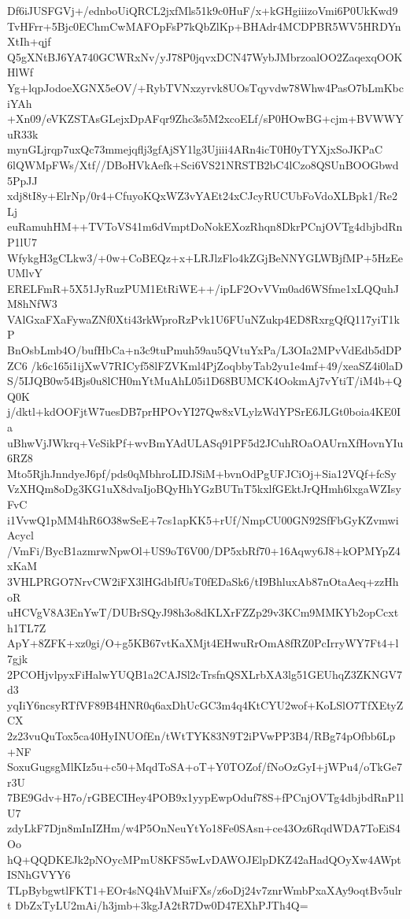 Df6iJUSFGVj+/ednboUiQRCL2jxfMls51k9c0HuF/x+kGHgiiizoVmi6P0UkKwd9
TvHFrr+5Bjc0EChmCwMAFOpFsP7kQbZlKp+BHAdr4MCDPBR5WV5HRDYnXtIh+qjf
Q5gXNtBJ6YA740GCWRxNv/yJ78P0jqvxDCN47WybJMbrzoalOO2ZaqexqOOKHlWf
Yg+lqpJodoeXGNX5eOV/+RybTVNxzyrvk8UOsTqyvdw78Whw4PasO7bLmKbciYAh
+Xn09/eVKZSTAsGLejxDpAFqr9Zhc3s5M2xcoELf/sP0HOwBG+cjm+BVWWYuR33k
mynGLjrqp7uxQc73mmejqflj3gfAjSY1lg3Ujiii4ARn4icT0H0yTYXjxSoJKPaC
6lQWMpFWs/Xtf//DBoHVkAefk+Sci6VS21NRSTB2bC4lCzo8QSUnBOOGbwd5PpJJ
xdj8tI8y+ElrNp/0r4+CfuyoKQxWZ3vYAEt24xCJcyRUCUbFoVdoXLBpk1/Re2Lj
euRamuhHM++TVToVS41m6dVmptDoNokEXozRhqn8DkrPCnjOVTg4dbjbdRnP1lU7
WfykgH3gCLkw3/+0w+CoBEQz+x+LRJlzFlo4kZGjBeNNYGLWBjfMP+5HzEeUMlvY
ERELFmR+5X51JyRuzPUM1EtRiWE++/ipLF2OvVVm0ad6WSfme1xLQQuhJM8hNfW3
VAlGxaFXaFywaZNf0Xti43rkWproRzPvk1U6FUuNZukp4ED8RxrgQfQ117yiT1kP
BnOsbLmb4O/bufHbCa+n3c9tuPmuh59au5QVtuYxPa/L3OIa2MPvVdEdb5dDPZC6
/k6c165i1ijXwV7RICyf58lFZVKml4PjZoqbbyTab2yu1e4mf+49/xeaSZ4i0laD
S/5IJQB0w54Bjs0u8lCH0mYtMuAhL05i1D68BUMCK4OokmAj7vYtiT/iM4b+QQ0K
j/dktl+kdOOFjtW7uesDB7prHPOvYI27Qw8xVLylzWdYPSrE6JLGt0boia4KE0Ia
uBhwVjJWkrq+VeSikPf+wvBmYAdULASq91PF5d2JCuhROaOAUrnXfHovnYIu6RZ8
Mto5RjhJnndyeJ6pf/pds0qMbhroLIDJSiM+bvnOdPgUFJCiOj+Sia12VQf+fcSy
VzXHQm8oDg3KG1uX8dvaIjoBQyHhYGzBUTnT5kxlfGEktJrQHmh6lxgaWZIsyFvC
i1VvwQ1pMM4hR6O38wSeE+7cs1apKK5+rUf/NmpCU00GN92SfFbGyKZvmwiAcycl
/VmFi/BycB1azmrwNpwOl+US9oT6V00/DP5xbRf70+16Aqwy6J8+kOPMYpZ4xKaM
3VHLPRGO7NrvCW2iFX3lHGdbIfUsT0fEDaSk6/tI9BhluxAb87nOtaAeq+zzHhoR
uHCVgV8A3EnYwT/DUBrSQyJ98h3o8dKLXrFZZp29v3KCm9MMKYb2opCcxth1TL7Z
ApY+8ZFK+xz0gi/O+g5KB67vtKaXMjt4EHwuRrOmA8fRZ0PcIrryWY7Ft4+l7gjk
2PCOHjvlpyxFiHalwYUQB1a2CAJSl2cTrsfnQSXLrbXA3lg51GEUhqZ3ZKNGV7d3
yqIiY6ncsyRTfVF89B4HNR0q6axDhUcGC3m4q4KtCYU2wof+KoLSlO7TfXEtyZCX
2z23vuQuTox5ca40HyINUOfEn/tWtTYK83N9T2iPVwPP3B4/RBg74pOfbb6Lp+NF
SoxuGugsgMlKIz5u+c50+MqdToSA+oT+Y0TOZof/fNoOzGyI+jWPu4/oTkGe7r3U
7BE9Gdv+H7o/rGBECIHey4POB9x1yypEwpOduf78S+fPCnjOVTg4dbjbdRnP1lU7
zdyLkF7Djn8mInIZHm/w4P5OnNeuYtYo18Fe0SAsn+ce43Oz6RqdWDA7ToEiS4Oo
hQ+QQDKEJk2pNOycMPmU8KFS5wLvDAWOJElpDKZ42aHadQOyXw4AWptISNhGVYY6
TLpBybgwtlFKT1+EOr4sNQ4hVMuiFXs/z6oDj24v7znrWmbPxaXAy9oqtBv5ulrt
DbZxTyLU2mAi/h3jmb+3kgJA2tR7Dw0D47EXhPJTh4Q=
